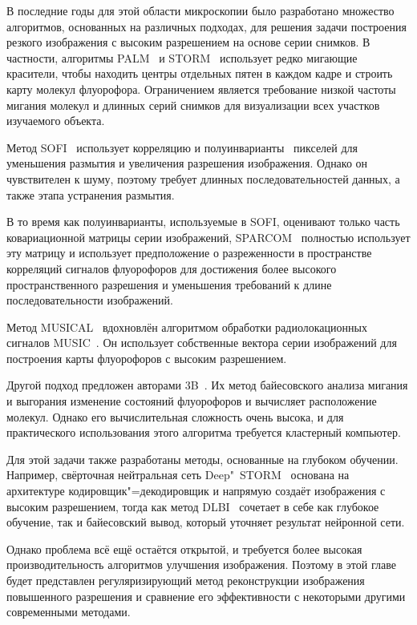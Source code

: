 В последние годы для этой области микроскопии было разработано множество алгоритмов, основанных на различных подходах, для решения задачи построения резкого изображения с высоким разрешением на основе серии снимков. В частности, алгоритмы PALM~\cite{betzig2006imaging} и STORM~\cite{rust2006sub} использует редко мигающие красители, чтобы находить центры отдельных пятен в каждом кадре и строить карту молекул флуорофора. Ограничением является требование низкой частоты мигания молекул и длинных серий снимков для визуализации всех участков изучаемого объекта.

Метод SOFI~\cite{dertinger2009fast, dertinger2010achieving} использует корреляцию и полуинварианты~\cite{75086, малахов1978кумулянтный} пикселей для уменьшения размытия и увеличения разрешения изображения. Однако он чувствителен к шуму, поэтому требует длинных последовательностей данных, а также этапа устранения размытия.

В то время как полуинварианты, используемые в SOFI, оценивают только часть ковариационной матрицы серии изображений, SPARCOM~\cite{Solomon:18} полностью использует эту матрицу и использует предположение о разреженности в пространстве корреляций сигналов флуорофоров для достижения более высокого пространственного разрешения и уменьшения требований к длине последовательности изображений.

Метод MUSICAL~\cite{agarwal2016multiple} вдохновлён алгоритмом обработки радиолокационных сигналов MUSIC~\cite{schmidt1986multiple}. Он использует собственные вектора серии изображений для построения карты флуорофоров с высоким разрешением.

Другой подход предложен авторами 3B~\cite{cox2012bayesian}. Их метод байесовского анализа мигания и выгорания  изменение состояний флуорофоров и вычисляет расположение молекул. Однако его вычислительная сложность очень высока, и для практического использования этого алгоритма требуется кластерный компьютер.

Для этой задачи также разработаны методы, основанные на глубоком обучении. Например, свёрточная нейтральная сеть Deep"~STORM~\cite{Nehme:18} основана на архитектуре кодировщик"=декодировщик и напрямую создаёт изображения с высоким разрешением, тогда как метод DLBI~\cite{10.1093/bioinformatics/bty241} сочетает в себе как глубокое обучение, так и байесовский вывод, который уточняет результат нейронной сети. 

Однако проблема всё ещё остаётся открытой, и требуется более высокая производительность алгоритмов улучшения изображения. Поэтому в этой главе будет представлен регуляризирующий метод реконструкции изображения повышенного разрешения и сравнение его эффективности с некоторыми другими современными методами.

